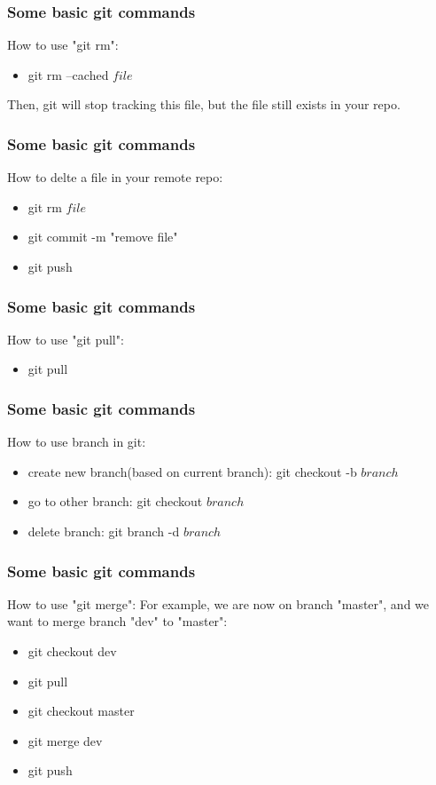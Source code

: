 \documentclass[aspectratio=169]{beamer}
\begin{document}
\begin{frame}
  \frametitle{Some basic git commands}
  How to use "git rm":
  \begin{itemize}
    \item git rm --cached $file$
  \end{itemize}
  Then, git will stop tracking this file, but the file still exists in your repo.
\end{frame}

\begin{frame}
  \frametitle{Some basic git commands}
  How to delte a file in your remote repo:
  \begin{itemize}
    \item git rm $file$
    \item git commit -m "remove file"
    \item git push
  \end{itemize}
\end{frame}

\begin{frame}
  \frametitle{Some basic git commands}
  How to use "git pull":
  \begin{itemize}
    \item git pull
  \end{itemize}
\end{frame}

\begin{frame}
  \frametitle{Some basic git commands}
  How to use branch in git:
  \begin{itemize}
    \item create new branch(based on current branch): git checkout -b $branch$
    \item go to other branch: git checkout $branch$
    \item delete branch: git branch -d $branch$
  \end{itemize}
\end{frame}

\begin{frame}
  \frametitle{Some basic git commands}
  How to use "git merge":
  For example, we are now on branch "master", and we want to merge branch "dev" to "master":
  \begin{itemize}
    \item git checkout dev
    \item git pull
    \item git checkout master
    \item git merge dev
    \item git push
  \end{itemize}
\end{frame}
\end{document}
